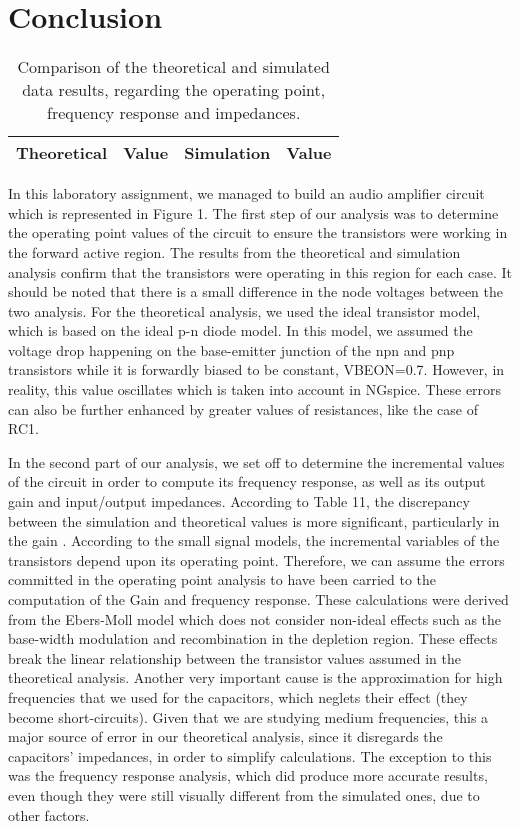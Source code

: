 \section{Conclusion}
\label{sec:conclusion}
\begin{table}[!h]
  \centering
  \begin{tabular}{c c c c}
    \hline    
    {\bf Theoretical} & {\bf Value} & {\bf Simulation} & {\bf Value}\\ \hline
     
  \end{tabular}
  \caption{Comparison of the theoretical and simulated data results, regarding the operating point, frequency response and impedances.}
  \label{tab:comp}
\end{table}

In this laboratory assignment, we managed to build an audio amplifier circuit which is represented in Figure 1. The first step of our analysis was to determine the operating point values of the circuit to ensure the transistors were working in the forward active region. The results from the theoretical and simulation analysis confirm that the transistors were operating in this region for each case. It should be noted that there is a small difference in the node voltages between the two analysis. For the theoretical analysis, we used the ideal transistor model, which is based on the ideal p-n diode model. In this model, we assumed the voltage drop happening on the base-emitter junction of the npn and pnp transistors while it is forwardly biased to be constant, VBEON=0.7. However, in reality, this value oscillates which is taken into account in NGspice. These errors can also be further enhanced by greater values of resistances, like the case of RC1.

In the second part of our analysis, we set off to determine the incremental values of the circuit in order to compute its frequency response, as well as its output gain and input/output impedances. According to Table 11, the discrepancy between the simulation and theoretical values is more significant, particularly in the gain . According to the small signal models, the incremental variables of the transistors depend upon its operating point. Therefore, we can assume the errors committed in the operating point analysis to have been carried to the computation of the Gain and frequency response. These calculations were derived from the Ebers-Moll model which does not consider non-ideal effects such as the base-width modulation and recombination in the depletion region. These effects break the linear relationship between the transistor values assumed in the theoretical analysis. Another very important cause is the approximation for high frequencies that we used for the capacitors, which neglets their effect (they become short-circuits). Given that we are studying medium frequencies, this a major source of error in our theoretical analysis, since it disregards the capacitors' impedances, in order to simplify calculations. The exception to this was the frequency response analysis, which did produce more accurate results, even though they were still visually different from the simulated ones, due to other factors.


